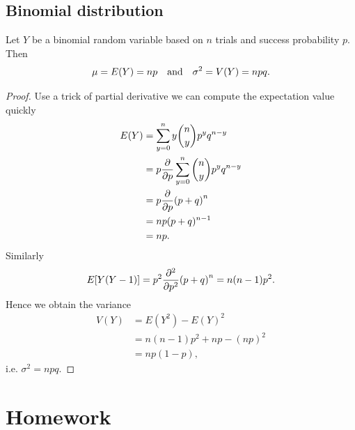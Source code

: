 \documentclass[10pt]{article}
\begin{document}
\subsection{Binomial distribution}
Let $Y$ be a binomial random variable based on $n$ trials and success probability $p$. Then
\begin{equation}
	\mu = E(Y) = np\qand \sigma^2 = V(Y) = npq.
\end{equation}
\begin{proof}
	Use a trick of partial derivative we can compute the expectation value quickly
	\begin{align*}
		E(Y) &= \sum_{y=0}^n y \binom{n}{y} p^y q^{n-y} \\
		&= p \pdv{p} \sum_{y=0}^n \binom{n}{y} p^y q^{n-y} \\
		&= p \pdv{p} (p+q)^n \\
		&= np (p+q)^{n-1} \\
		&= np.
	\end{align*}
	Similarly
	\begin{equation}
		E[Y(Y-1)] = p^2 \pdv[2]{p} (p+q)^n = n(n-1)p^2.
	\end{equation}
	Hence we obtain the variance
	\begin{align*}
		V(Y) &= E(Y^2) - E(Y)^2 \\
		&= n(n-1)p^2 + np - (np)^2 \\
		&= np(1-p),
	\end{align*}
	i.e. $\sigma^2 = npq$.
\end{proof}

	\newpage

	\section{Homework}\label{sec: homework}
\end{document}
